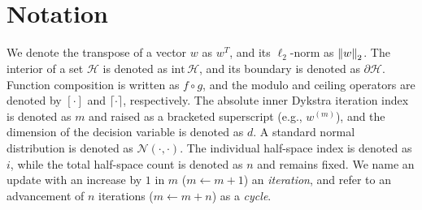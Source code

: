 \section*{Notation}
We denote the transpose of a vector $w$ as $w^T$, and its $\ell_{2}$-norm as $\left\| w \right\|_2$. The interior of a set $\mathcal{H}$ is denoted as $\text{int}\,\mathcal{H}$, and its boundary is denoted as $\partial\mathcal{H}$. Function composition is written as $f \circ g$, and the modulo and ceiling operators are denoted by $[\cdot]$ and $\lceil \cdot \rceil$, respectively. The absolute inner Dykstra iteration index is denoted as $m$ and raised as a bracketed superscript (e.g., $w^{(m)}$), and the dimension of the decision variable is denoted as $d$. A standard normal distribution is denoted as $\mathcal{N}(\cdot,\cdot)$. The individual half-space index is denoted as $i$, while the total half-space count is denoted as $n$ and remains fixed. We name an update with an increase by $1$ in $m$ ($m \leftarrow m+1$) an \emph{iteration}, and refer to an advancement of $n$ iterations ($m \leftarrow m+n$) as a \emph{cycle}.